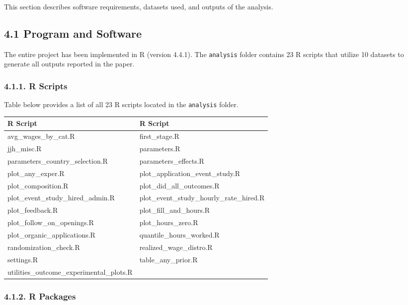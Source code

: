 \documentclass[10pt]{article}
\newenvironment{eightpt}{\begingroup\fontsize{8}{13}\selectfont}{\endgroup}
\begin{document}
This section describes software requirements, datasets used, and outputs of the analysis.

\subsection*{4.1 Program and Software}

The entire project has been implemented in R (version 4.4.1). The \texttt{analysis} folder contains 23 R scripts that utilize 10 datasets to generate all outputs reported in the paper. 

\subsubsection*{4.1.1. R Scripts}

Table below provides a list of all 23 R scripts located in the \texttt{analysis} folder.

\begin{eightpt}
\begin{tabularx}{\textwidth}{TT}
\toprule
R Script & R Script \\
\midrule
avg\_wages\_by\_cat.R & first\_stage.R \\
jjh\_misc.R & parameters.R \\
parameters\_country\_selection.R & parameters\_effects.R \\
plot\_any\_exper.R & plot\_application\_event\_study.R \\
plot\_composition.R & plot\_did\_all\_outcomes.R \\
plot\_event\_study\_hired\_admin.R & plot\_event\_study\_hourly\_rate\_hired.R \\
plot\_feedback.R & plot\_fill\_and\_hours.R \\
plot\_follow\_on\_openings.R & plot\_hours\_zero.R \\
plot\_organic\_applications.R & quantile\_hours\_worked.R \\
randomization\_check.R & realized\_wage\_distro.R \\
settings.R & table\_any\_prior.R \\
utilities\_outcome\_experimental\_plots.R & \\
\bottomrule
\end{tabularx}
\end{eightpt}

\subsubsection*{4.1.2. R Packages}
\end{document}
